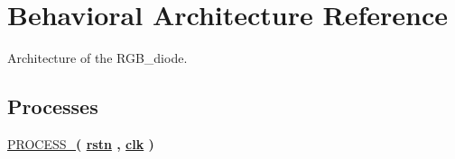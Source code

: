 \hypertarget{classRGB__diode__controller_1_1Behavioral}{\section{Behavioral Architecture Reference}
\label{classRGB__diode__controller_1_1Behavioral}
}


Architecture of the R\-G\-B\-\_\-diode.  


\subsection*{Processes}
 \begin{DoxyCompactItemize}
\item 
\hypertarget{classRGB__diode__controller_1_1Behavioral_af9fe725e8967ed92c318658c87a3e8cc}{\hyperlink{classRGB__diode__controller_1_1Behavioral_af9fe725e8967ed92c318658c87a3e8cc}{P\-R\-O\-C\-E\-S\-S\-\_}{\bfseries  ( {\bfseries {\bfseries \hyperlink{classRGB__diode__controller_aba021aec4b477b89079bb58ccadcc67e}{rstn}} \textcolor{vhdlchar}{ }\textcolor{vhdlchar}{ }\textcolor{vhdlchar}{ }} , {\bfseries {\bfseries \hyperlink{classRGB__diode__controller_a8120037e0ee47c35ba2d79242209c72e}{clk}} \textcolor{vhdlchar}{ }} )}}\label{classRGB__diode__controller_1_1Behavioral_af9fe725e8967ed92c318658c87a3e8cc}

\end{DoxyCompactItemize}
